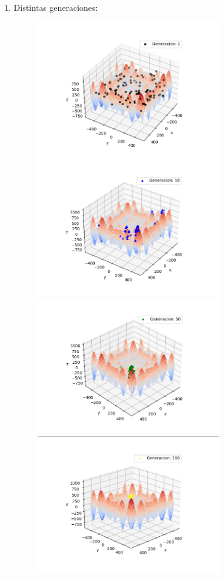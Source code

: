 \documentclass[11pt,letterpaper]{article}
\begin{document}
\begin{enumerate}[label=\alph*)]
\begin{enumerate}[label=\arabic*.]
            \item Distintas generaciones:
            \begin{figure}[H]
                \centering
                \includegraphics[width=8cm]{images/parametros-ajustados/parametros-gen001.png}
                \includegraphics[width=8cm]{images/parametros-ajustados/parametros-gen010.png}
                \includegraphics[width=8cm]{images/parametros-ajustados/parametros-gen050.png}
                \includegraphics[width=8cm]{images/parametros-ajustados/parametros-gen100.png}
                \label{fig:parametros-gen-n}
            \end{figure}
        \end{enumerate}


\end{enumerate}
\end{document}
